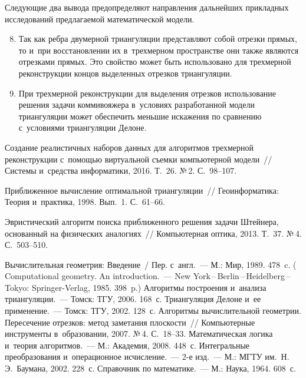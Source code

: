 \begin{multicols}{2}
  Следующие два вывода предопределяют на\-прав\-ле\-ния дальнейших 
при\-клад\-ных исследований предлагаемой математической модели.
  \begin{enumerate}[1.]
  \setcounter{enumi}{7}
  \item Так как реб\-ра двумерной триангуляции пред\-став\-ля\-ют собой отрезки 
прямых, то и~при восстановлении их в~трехмерном пространстве они также 
являются отрезками прямых. Это свойство может быть использовано для 
трехмерной реконструкции концов выделенных отрезков триангуляции.
  \item При трехмерной реконструкции для выделения отрезков использование 
решения задачи коммивояжера в~условиях разработанной модели триангуляции 
может обеспечить меньшие искажения по срав\-не\-нию с~условиями 
триангуляции Делоне.
  \end{enumerate}
  
{\small\frenchspacing
 {%
 \begin{thebibliography}{99}
 Создание реалистичных наборов данных для алгоритмов 
трехмерной реконструкции с~по\-мощью виртуальной съем\-ки компьютерной модели~// 
Системы и~средства информатики, 2016. Т.~26. №\,2. С.~98--107.

 При\-бли\-жен\-ное вы\-чис\-ле\-ние оптимальной триангуляции~// 
Геоинформатика: Теория и~практика, 1998. Вып.~1. С.~61--66.

 Эвристический алгоритм поиска при\-бли\-жен\-но\-го решения 
задачи Штейнера, основанный на физических аналогиях~// Компьютерная оптика, 2013. 
Т.~37. №\,4. С.~503--510.

 Вы\-чис\-ли\-тель\-ная гео\-мет\-рия: Введение~/ Пер. с~англ.~--- 
М.: Мир, 1989. 478~c. ( Computational geometry. An 
introduction.~--- New York\,--\,Berlin\,--\,Heidelberg\,--\,Tokyo: Springer-Verlag, 
1985. 398~p.)
 Алгоритмы по\-стро\-ения и~анализа триангуляции.~--- 
Томск: ТГУ, 2006. 168~с.
 Триангуляция Делоне и~ее применение.~--- Томск: ТГУ, 2002. 128~с.
 Алгоритмы вы\-чис\-ли\-тель\-ной гео\-мет\-рии. 
Пересечение отрезков: метод заметания плос\-кости~// Компьютерные инструменты 
в~образовании, 2007. №\,4. С.~18--33.
 Математическая логика и~тео\-рия алгоритмов.~--- М.: Академия, 2008. 
448~с.
 Интегральные преобразования и~операционное 
ис\-чис\-ле\-ние.~--- 2-е изд.~--- М.: МГТУ им.\ Н.\,Э.~Баумана, 2002. 
228~с.
 Справочник по математике.~--- М.: Наука, 1964. 
608~с.


\end{thebibliography}}}
\end{multicols}
